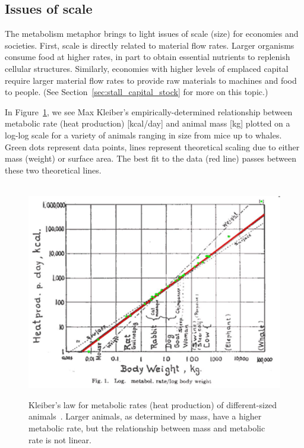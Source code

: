 \subsection{Issues of scale}
\label{sec:metabolic_scale}

The metabolism metaphor brings to light issues of scale (size)
for economies and societies.
First, scale is directly related to material flow rates.
Larger organisms consume food at higher rates,
in part to obtain essential nutrients to replenish cellular structures.
Similarly, economies with higher levels of emplaced capital
require larger material flow rates to provide 
raw materials to machines and food to people.
(See Section~\ref{sec:stall_capital_stock} for more on this topic.)

In Figure~\ref{fig:Kleiber_law},
we see Max Kleiber's empirically-determined relationship between
metabolic rate (heat production) [kcal/day] and
animal mass [kg] 
plotted on a log-log scale
for a variety of animals
ranging in size from mice up to whales.
Green dots represent data points,
lines represent theoretical scaling due to either mass (weight)
or surface area.
The best fit to the data (red line)
passes between these two theoretical lines.

\begin{figure}[!ht]
\centering\
\includegraphics[width=\linewidth]{Part_0/Chapter_Acct_For_WoN/images/Kleiber1947.jpg}
\caption[Kleiber's law for metabolic rates of animals]{Kleiber's law 
for metabolic rates (heat production) of different-sized animals~\cite[p.530]{Kleiber1947}.
Larger animals, as determined by mass, have a higher metabolic rate, 
but the relationship between mass and metabolic rate is not linear.}
\label{fig:Kleiber_law}
\end{figure}

